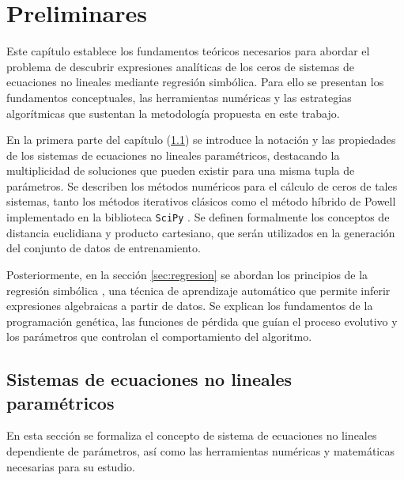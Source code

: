 \chapter{Preliminares}\label{sec:preliminares}

Este capítulo establece los fundamentos teóricos necesarios para abordar el problema de descubrir expresiones analíticas de los ceros de sistemas de ecuaciones no lineales mediante regresión simbólica. Para ello se presentan los fundamentos conceptuales, las herramientas numéricas y las estrategias algorítmicas que sustentan la metodología propuesta en este trabajo.

En la primera parte del capítulo (\ref{sec:sistemas}) se introduce la notación y las propiedades de los sistemas de ecuaciones no lineales paramétricos, destacando la multiplicidad de soluciones que pueden existir para una misma tupla de parámetros. Se describen los métodos numéricos para el cálculo de ceros de tales sistemas, tanto los métodos iterativos clásicos como el método híbrido de Powell implementado en la biblioteca \texttt{SciPy} \cite{virtanen2020scipy}. Se definen formalmente los conceptos de distancia euclidiana y producto cartesiano, que serán utilizados en la generación del conjunto de datos de entrenamiento.

Posteriormente, en la sección \ref{sec:regresion} se abordan los principios de la regresión simbólica \cite{koza1992genetic}, una técnica de aprendizaje automático que permite inferir expresiones algebraicas a partir de datos. Se explican los fundamentos de la programación genética, las funciones de pérdida que guían el proceso evolutivo y los parámetros que controlan el comportamiento del algoritmo.

\section{Sistemas de ecuaciones no lineales paramétricos} \label{sec:sistemas}

En esta sección se formaliza el concepto de sistema de ecuaciones no lineales dependiente de parámetros, así como las herramientas numéricas y matemáticas necesarias para su estudio.

